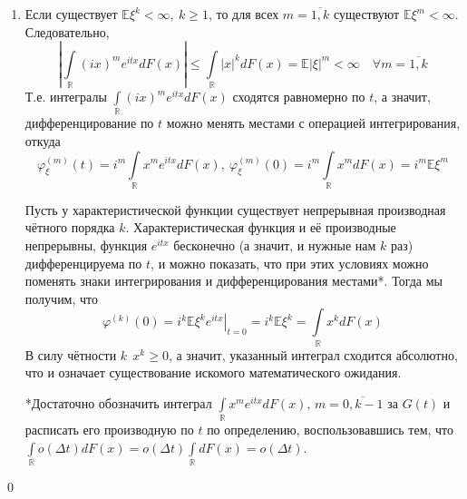 \documentclass[oneside,final,14pt]{extreport}
\renewenvironment{proof}{{\bfseries Доказательство.}}{\qed}
\theoremstyle{plain}
\theoremstyle{definition}
\theoremstyle{named}
\begin{document}
\begin{proof}
\begin{enumerate}
        \item Если существует $\mathbb{E}\xi^{k}<\infty,~ k \geqslant 1$, то для всех $m = \overline{1, k}$ существуют $\mathbb{E}\xi^{m}<\infty$. Следовательно,
        \begin{equation*}
            \left|\int\limits_{\mathbb{R}}(i x)^{m} e^{i t x} d F(x)\right| \leqslant \int\limits_{\mathbb{R}}|x|^{k} d F(x)=\mathbb{E}|\xi|^{m}<\infty \quad \forall m = \overline{1, k}
        \end{equation*}
        Т.е. интегралы $\int\limits_{\mathbb{R}}(i x)^{m} e^{i t x} d F(x)$ сходятся равномерно по $t$, а значит, дифференцирование по $t$ можно менять местами с операцией интегрирования, откуда
        \begin{equation*}
            \varphi_{\xi}^{(m)}(t)=i^{m} \int\limits_{\mathbb{R}} x^{m} e^{i t x} d F(x),~ \varphi_{\xi}^{(m)}(0)=i^{m} \int\limits_{\mathbb{R}} x^{m} d F(x)=i^{m} \mathbb{E}\xi^{m}
        \end{equation*}
        
        Пусть у характеристической функции существует непрерывная производная чётного порядка $k$. Характеристическая функция и её производные непрерывны, функция $e^{itx}$ бесконечно (а значит, и нужные нам $k$ раз) дифференцируема по $t$, и можно показать, что при этих условиях можно поменять знаки интегрирования и дифференцирования местами*. Тогда мы получим, что 
        $$\varphi^{(k)}(0) = i^k \left.\mathbb{E}\xi^k e^{itx}\right|_{t=0} = i^k \mathbb{E}\xi^k = 
        \int\limits_{\mathbb{R}} x^k dF(x)
        $$
        В силу чётности $k ~~ x^k \geqslant 0$, а значит, указанный интеграл сходится абсолютно, что и означает существование искомого математического ожидания.
        
        *Достаточно обозначить интеграл $\int\limits_{\mathbb{R}}{x^{m} e^{itx}dF(x)}, \, m = \overline{0, k-1}$ за $G(t)$ и расписать его производную по $t$ по определению, воспользовавшись тем, что $\int\limits_{\mathbb{R}} o(\Delta t) dF(x) = o(\Delta t) \int\limits_{\mathbb{R}} dF(x) = o(\Delta t)$. 
        
    \end{enumerate}
\end{proof}
\end{document}
